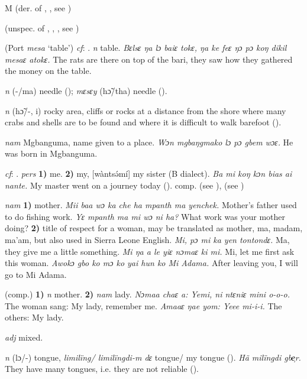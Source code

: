 \begin{letter}{M}
 (der. of , , see ) 

 (unspec. of , , , see ) 

 (Port \textit{mesa} ‘table') \textit{cf}: . \textit{n} table. \textit{Bɛlsɛ ŋa lɔ baiɛ tokɛ, ŋa ke feɛ ŋɔ pɔ koŋ dikil mesaɛ atokɛ.} The rats are there on top of the bari, they saw how they gathered the money on the table.

 \textit{n} (-/ma) needle (\citealt{Sumner1921}); \textit{mɛsɛy} (hɔ̃/tha) needle (\citealt{Pichl1967}).

 \textit{n} (hɔ̃/-, i) rocky area, cliffs or rocks at a distance from the shore where many crabs and shells are to be found and where it is difficult to walk barefoot (\citealt{Pichl1967}).

 \textit{nam} Mgbanguma, name given to a place. \textit{Wɔn mgbaŋgmako lɔ pɔ gbem wɔɛ.} He was born in Mgbanguma.

 \textit{cf}: . \textit{pers} \textbf{1)} me. \textbf{2)} my, [wàntsə́mí] my sister (B dialect). \textit{Ba mi koŋ kɔn bias ai nante.} My master went on a journey today (\citealt{Pichl1967}). comp.  (see ),  (see ) 

 \textit{nam} \textbf{1)} mother. \textit{Mii baa wɔ ka che ha mpanth ma yenchek.} Mother's father used to do fishing work. \textit{Yɛ mpanth ma mi wɔ ni ha?} What work was your mother doing? \textbf{2)} title of respect for a woman, may be translated as mother, ma, madam, ma'am, but also used in Sierra Leone English. \textit{Mi, pɔ mi ka yen tontondɛ.} Ma, they give me a little something. \textit{Mi ŋa a le yiɛ nɔmaɛ ki mi.} Mi, let me first ask this woman. \textit{Awokɔ gbo ko mɔ ko yai hun ko Mi Adama.} After leaving you, I will go to Mi Adama.

 (comp.) \textbf{1)} \textit{n} mother. \textbf{2)} \textit{nam} lady. \textit{Nɔmaa chaɛ a: Yemi, ni ntɛniɛ mini o-o-o.} The woman sang: My lady, remember me. \textit{Amaaɛ ŋae yom: Yeee mi-i-i.} The others: My lady.

 \textit{adj} mixed.

 \textit{n} (lɔ/-) tongue, \textit{limilïng/ limilïngdi-m dɛ} tongue/ my tongue (\citealt{Pichl1967}). \textit{Hã milïngdi gbe̹r.} They have many tongues, i.e. they are not reliable (\citealt{Pichl1967}).


\end{letter}

